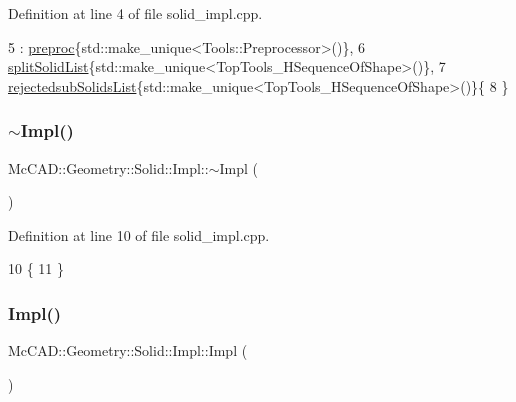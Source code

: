 Definition at line 4 of file solid\+\_\+impl.\+cpp.


\begin{DoxyCode}
5   : \hyperlink{classMcCAD_1_1Geometry_1_1Solid_1_1Impl_ab6393d9ccf9e8046915b6f2b1facfb03}{preproc}\{std::make\_unique<Tools::Preprocessor>()\},
6     \hyperlink{classMcCAD_1_1Geometry_1_1Solid_1_1Impl_a962b0107f7c5cda9270fdd4e5e0024a3}{splitSolidList}\{std::make\_unique<TopTools\_HSequenceOfShape>()\},
7     \hyperlink{classMcCAD_1_1Geometry_1_1Solid_1_1Impl_a464bf027934dad6084175700222b1582}{rejectedsubSolidsList}\{std::make\_unique<TopTools\_HSequenceOfShape>()\}\{
8 \}
\end{DoxyCode}
\mbox{\label{classMcCAD_1_1Geometry_1_1Solid_1_1Impl_af55a998db65d4bda9732591cd7c4e5ee}} 
\subsubsection{\texorpdfstring{$\sim$\+Impl()}{~Impl()}\hspace{0.1cm}{\footnotesize\ttfamily [1/2]}}
{\footnotesize\ttfamily Mc\+C\+A\+D\+::\+Geometry\+::\+Solid\+::\+Impl\+::$\sim$\+Impl (\begin{DoxyParamCaption}{ }\end{DoxyParamCaption})}



Definition at line 10 of file solid\+\_\+impl.\+cpp.


\begin{DoxyCode}
10                              \{
11 \}
\end{DoxyCode}
\mbox{\label{classMcCAD_1_1Geometry_1_1Solid_1_1Impl_a0e6034dcecdd2804371ed09fef697e3d}} 
\subsubsection{\texorpdfstring{Impl()}{Impl()}\hspace{0.1cm}{\footnotesize\ttfamily [2/2]}}
{\footnotesize\ttfamily Mc\+C\+A\+D\+::\+Geometry\+::\+Solid\+::\+Impl\+::\+Impl (\begin{DoxyParamCaption}{ }\end{DoxyParamCaption})}

